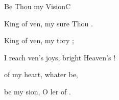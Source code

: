 \documentclass[12pt]{book}
\begin{document}
\begin{song}{Be Thou my Vision}{C}
\begin{SBExtraKeys}
{\begin{SBVerse}
     King of ven, 
        my sure Thou .

    \Ch{[Interlude: }{}   \Ch{A]}{}
  \end{SBVerse}


  \begin{SBVerse}
     King of ven, 
        my tory ;

     I reach ven's joys, 
         bright Heaven's !

     of my  heart, 
        whater be,

     be my sion, 
        O ler of .

    \Ch{[Interlude:}{}    \Ch{A]}{}
  \end{SBVerse}

  }\end{SBExtraKeys}
\end{song}
\end{document}
